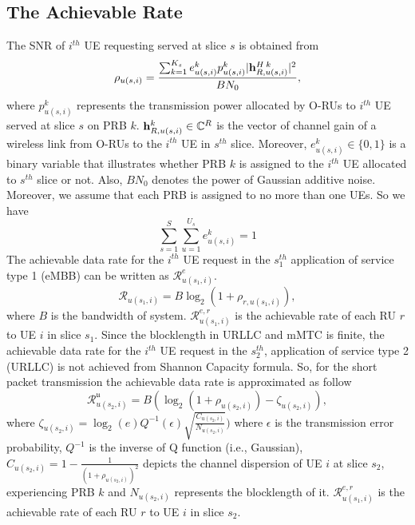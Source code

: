 \documentclass[conference]{IEEEtran}
\begin{document}
\subsection{The Achievable Rate}
The SNR of $i^{th}$ UE requesting served at slice $s$ is obtained from
\begin{equation}\label{eq2}
\rho_{u(s,i)} =  \frac{\sum_{k=1}^{K_{s}}e_{u(s,i)}^k p_{u(s,i)}^{k}|{\bold{h}_{R,u(s,i)}^{H \: k}}|^2}{BN_0},
\end{equation} 
where $p_{u(s,i)}^{k}$ represents the transmission power allocated by O-RUs to $i^{th}$ UE served at slice $s$ on PRB $k$.
${\bold{h}_{R,u(s,i)}^{k}} \in \mathbb{C}^{R}$ is the vector of channel gain of a wireless link from 
O-RUs to the $i^{th}$ UE in $s^{th}$ slice. 
Moreover, $e_{u(s,i)}^k \in \{0,1\}$ is a binary variable that illustrates whether PRB $k$ is assigned to the $i^{th}$ UE allocated to $s^{th}$ slice or not. 
Also, $BN_0$ denotes the power of Gaussian additive noise.
Moreover, we assume that each PRB is assigned to no more than one UEs. So we have
\begin{equation}
\sum_{s=1}^S \sum_{u=1}^{U_s} e_{u(s,i)}^k = 1
\end{equation} 
The achievable data rate for the $i^{th}$ UE request in the $s_{1}^{th}$ application of service type 1 (eMBB) can be written as $\mathcal{R}_{u(s_1,i)}^{e}$.
\begin{equation}\label{eq1}
\mathcal{R}_{u(s_1,i)} =  B \log_2({1+ \rho_{r,u(s_1,i)}}),
\end{equation}
where $B$ is the bandwidth of system. 
$\mathcal{R}_{u(s_1,i)}^{e,r}$ is the achievable rate of each RU $r$ to UE $i$ in slice $s_1$.
Since the blocklength in URLLC and mMTC is finite, the achievable data rate for the $i^{th}$ UE request in the $s_{2}^{th} $, application of service type 2 (URLLC) is not achieved from Shannon Capacity formula. So, for the short packet transmission the achievable data rate is approximated as follow
\begin{equation}\label{eq11}
\mathcal{R}_{u(s_2,i)}^{\mathfrak{u}} =  B (\log_2({1+ \rho_{u(s_2,i)}})- \zeta_{u(s_2,i)}), 
\end{equation}
where $\zeta_{u(s_2,i)} = \log_2({e})Q^{-1}(\epsilon) \sqrt{\frac{C_{u(s_2,i)}}{N_{u(s_2,i)}}})$
where $\epsilon$ is the transmission error probability, $Q^{-1}$ is the inverse of Q function (i.e., Gaussian),
$C_{u(s_2,i)} = 1 - \frac{1}{(1+\rho_{u(s_2,i)})^2}$ depicts the channel dispersion of UE  $i$ at slice $s_2$, experiencing PRB $k$ and
$N_{u(s_2,i)}$ represents the blocklength of it. 
$\mathcal{R}_{u(s_1,i)}^{e,r}$ is the achievable rate of each RU $r$ to UE $i$ in slice $s_2$.
\end{document}
